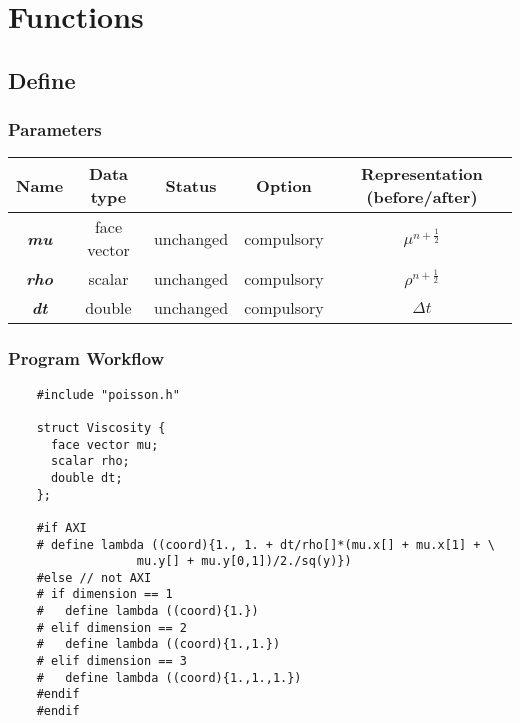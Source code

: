 \documentclass[a4paper]{article}
\newcommand{\para}[1]{\textbf{\emph{\textcolor{para}{#1}}}}
\begin{document}
\section{Functions}

\subsection{Define}

\subsubsection{Parameters}
\begin{center}
  \begin{tabular}{|c|c|c|c|c|}
    \hline
    Name & Data type & Status & Option & Representation (before/after)\\[0.5ex]
    \hline\hline
    \para{mu} & face vector & unchanged & compulsory & $\mu^{n+ \frac{1}{2}}$\\
    \hline
    \para{rho} & scalar & unchanged & compulsory & $ \rho^{n + \frac{1}{2}}$ \\
    \hline
    \para{dt} & double & unchanged & compulsory & $\Delta t$\\
    \hline
  \end{tabular}
\end{center}

\subsubsection{Program Workflow}
\begin{multicols}{2}
  \columnbreak
  \begin{verbatim}
    #include "poisson.h"

    struct Viscosity {
      face vector mu;
      scalar rho;
      double dt;
    };

    #if AXI
    # define lambda ((coord){1., 1. + dt/rho[]*(mu.x[] + mu.x[1] + \
                  mu.y[] + mu.y[0,1])/2./sq(y)})
    #else // not AXI
    # if dimension == 1
    #   define lambda ((coord){1.})
    # elif dimension == 2
    #   define lambda ((coord){1.,1.})
    # elif dimension == 3
    #   define lambda ((coord){1.,1.,1.})
    #endif
    #endif
  \end{verbatim}
\end{multicols}
\end{document}
